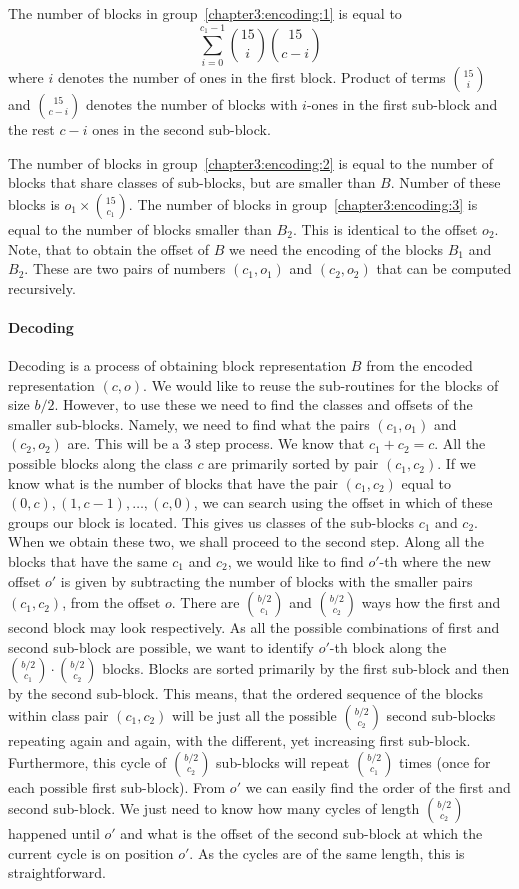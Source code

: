 The number of blocks in group~\ref{chapter3:encoding:1} is equal to
$$\sum_{i=0}^{c_1-1} {15\choose i} {15\choose c-i}$$ where $i$ denotes the number
of ones in the first block. Product of terms ${15\choose i}$ and ${15\choose c-i}$
denotes the number of blocks with $i$-ones in the first sub-block and the rest
$c-i$ ones in the second sub-block.

The number of blocks in group~\ref{chapter3:encoding:2} is equal to the number of blocks that
share classes of sub-blocks, but are smaller than $B$. Number of these blocks is $o_1\times {15\choose c_1}$.
The number of blocks in group~\ref{chapter3:encoding:3} is equal to the number of blocks smaller 
than $B_2$. This is identical to the offset $o_2$. Note, that to obtain the offset of $B$
we need the encoding of the blocks $B_1$ and $B_2$. These are two pairs of numbers
$(c_1, o_1)$ and $(c_2, o_2)$ that can be computed recursively.

\paragraph{Decoding}

Decoding is a process of obtaining block representation $B$ from the encoded
representation $(c, o)$. We would like to reuse the sub-routines for the blocks
of size $b/2$. However, to use these we need to find the classes and offsets of
the smaller sub-blocks. Namely, we need to find what the pairs $(c_1, o_1)$ and
$(c_2, o_2)$ are. This will be a 3 step process. We know that $c_1 + c_2 = c$.
All the possible blocks along the class $c$ are primarily sorted by pair $(c_1, c_2)$.
If we know what is the number of blocks that have the pair $(c_1, c_2)$ equal to
$(0, c), (1, c-1), \ldots , (c, 0)$, we can search using the offset in which of these groups
our block is located. This gives us classes of the sub-blocks $c_1$ and $c_2$. When we obtain
these two, we shall proceed to the second step. Along all the blocks that have the same $c_1$ and $c_2$,
we would like to find $o'$-th where the new offset $o'$ is given by subtracting the number of
blocks with the smaller pairs $(c_1, c_2)$, from the offset $o$. There are ${b/2 \choose c_1}$
and ${b/2 \choose c_2}$ ways how the first and second block may look respectively. As all the
possible combinations of first and second sub-block are possible, we want to identify $o'$-th block
along the ${b/2 \choose c_1}\cdot {b/2 \choose c_2}$ blocks. Blocks are sorted primarily
by the first sub-block and then by the second sub-block. This means, that the ordered sequence of
the blocks within class pair $(c_1, c_2)$ will be just all the possible ${b/2 \choose c_2}$
second sub-blocks repeating again and again, with the different, yet increasing
first sub-block. Furthermore, this cycle of ${b/2 \choose c_2}$ sub-blocks will repeat
${b/2 \choose c_1}$ times (once for each possible first sub-block). From $o'$ we can easily
find the order of the first and second sub-block. We just need to know how many cycles of length
${b/2 \choose c_2}$ happened until $o'$ and what is the offset of the second sub-block at which
the current cycle is on position $o'$. As the cycles are of the same length, this is straightforward.

